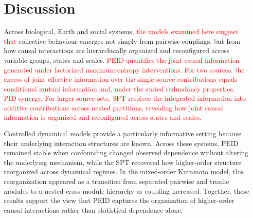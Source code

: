 \documentclass[fleqn,10pt]{wlscirep}
\newcommand{\rev}[1]{\textcolor{red}{#1}}
\theoremstyle{naturetheorem}
\begin{document}
\section*{Discussion}


Across biological, Earth and social systems, \rev{the models examined here suggest that }collective behaviour emerges not simply from pairwise couplings, but from how causal interactions are hierarchically organized and reconfigured across variable groups, states and scales. \rev{PEID quantifies the joint causal information generated under factorized maximum-entropy interventions. For two sources, the excess of joint effective information over the single-source contributions equals conditional mutual information and, under the stated redundancy properties, PID synergy. For larger source sets, SPT resolves the integrated information into additive contributions across nested partitions, revealing how joint causal information is organized and reconfigured across states and scales.}

Controlled dynamical models provide a particularly informative setting because their underlying interaction structures are known. Across these systems, PEID remained stable when confounding changed observed dependence without altering the underlying mechanism, while the SPT recovered how higher-order structure reorganized across dynamical regimes. In the mixed-order Kuramoto model, this reorganization appeared as a transition from separated pairwise and triadic modules to a nested cross-module hierarchy as coupling increased. Together, these results support the view that PEID captures the organization of higher-order causal interactions rather than statistical dependence alone.
\end{document}
